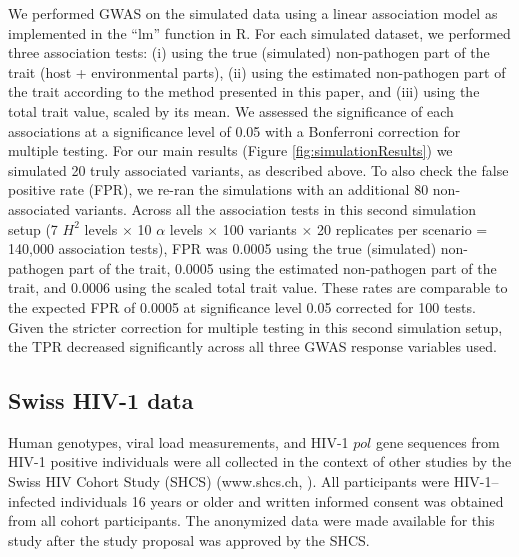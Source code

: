 \documentclass[11pt]{article}
\begin{document}
\begin{linenumbers}
We performed GWAS on the simulated data using a linear association model as implemented in the ``lm'' function in R. For each simulated dataset, we performed three association tests: (i) using the true (simulated) non-pathogen part of the trait (host + environmental parts), (ii) using the estimated non-pathogen part of the trait according to the method presented in this paper, and (iii) using the total trait value, scaled by its mean. We assessed the significance of each associations at a significance level of 0.05 with a Bonferroni correction for multiple testing. For our main results (Figure \ref{fig:simulationResults}) we simulated 20 truly associated variants, as described above. To also check the false positive rate (FPR), we re-ran the simulations with an additional 80 non-associated variants. Across all the association tests in this second simulation setup (7 $H^2$ levels $\times$ 10 $\alpha$ levels $\times$ 100 variants $\times$ 20 replicates per scenario = 140,000 association tests), FPR was 0.0005 using the true (simulated) non-pathogen part of the trait, 0.0005  using the estimated non-pathogen part of the trait, and 0.0006 using the scaled total trait value. These rates are comparable to the expected FPR of 0.0005 at significance level 0.05 corrected for 100 tests. Given the stricter correction for multiple testing in this second simulation setup, the TPR decreased significantly across all three GWAS response variables used.

\subsection*{Swiss HIV-1 data}

Human genotypes, viral load measurements, and HIV-1 $pol$ gene sequences from HIV-1 positive individuals were all collected in the context of other studies by the Swiss HIV Cohort Study (SHCS) (www.shcs.ch, \citet{Schoeni-Affolter2010, Scherrer2021CohortSHCS}). All participants were HIV-1–infected individuals 16 years or older and written informed consent was obtained from all cohort participants. The anonymized data were made available for this study after the study proposal was approved by the SHCS. 


\end{linenumbers}
\end{document}
